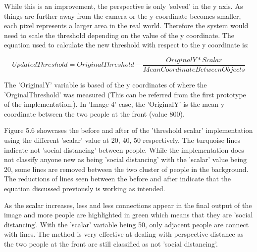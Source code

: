 \documentclass[12pt]{report}
\begin{document}
While this is an improvement, the perspective is only 'solved' in the y axis. As things are further away from the camera or the y coordinate becomes smaller, each pixel represents a larger area in the real world. Therefore the system would need to scale the threshold depending on the value of the y coordinate. The equation used to calculate the new threshold with respect to the y coordinate is:

\begin{equation*}
UpdatedThreshold = OriginalThreshold - \frac{OriginalY*Scalar}{MeanCoordinateBetweenObjects}
\end{equation*}

The 'OriginalY' variable is based of the y coordinates of where the 'OrginalThreshold' was measured (This can be referred from the first prototype of the implementation.). In 'Image 4' case, the 'OriginalY' is the mean y coordinate between the two people at the front (value 800). 

\vspace{2mm}

Figure 5.6 showcases the before and after of the 'threshold scalar' implementation using the different 'scalar' value at 20, 40, 50 respectively. The turquoise lines indicate not 'social distancing' between people. While  the implementation does not classify anyone new as being 'social distancing' with the 'scalar' value being 20, some lines are removed between the two cluster of people in the background. The reductions of lines seen between the before and after indicate that the equation discussed previously is working as intended.

\vspace{2mm}

As the scalar increases, less and less connections appear in the final output of the image and more people are highlighted in green which means that they are 'social distancing'. With the 'scalar' variable being 50, only adjacent people are connect with lines. The method is very effective at dealing with perspective distance as the two people at the front are still classified as not 'social distancing'.
\end{document}
